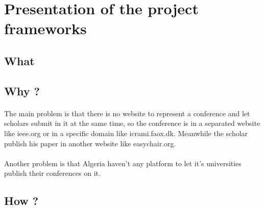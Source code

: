 \section{Presentation of the project frameworks}
	\subsection{What}
		\paragraph{}
	\subsection{Why ?}
		\paragraph{}
		The main problem is that there is no website to represent a conference and let scholars submit in it at the same time, so the conference is in a separated website like ieee.org or in a specific domain like icrami.faox.dk. Meanwhile the scholar publish his paper in another website like easychair.org.
		\paragraph{}
		Another problem is that Algeria haven't any platform to let it's universities publish their conferences on it.
	\subsection{How ?}
		\paragraph{}